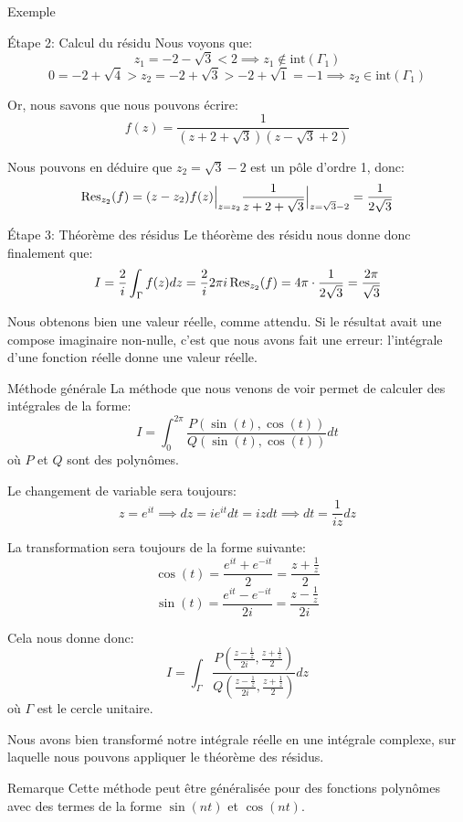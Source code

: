 \documentclass[a4paper]{article}
\begin{document}
\begin{parag}{Exemple}
\begin{subparag}{Étape 2: Calcul du résidu}
        Nous voyons que: 
        \[z_1 = -2 - \sqrt{3} < 2 \implies z_1 \not \in \text{int}\left(\Gamma_1\right)\] 
        \[0 = -2 + \sqrt{4} > z_2 = -2 + \sqrt{3} > -2 + \sqrt{1} = -1 \implies z_2 \in \text{int}\left(\Gamma_1\right)\]
        
        Or, nous savons que nous pouvons écrire: 
        \[f\left(z\right) = \frac{1}{\left(z + 2 + \sqrt{3}\right)\left(z - \sqrt{3} + 2\right)}\]
        
        Nous pouvons en déduire que $z_2 = \sqrt{3} -2$ est un pôle d'ordre 1, donc: 
        \[\Res_{z_2}\left(f\right) = \left(z-z_2\right) f\left(z\right) \eval_{z=z_2}^{} \frac{1}{z + 2 + \sqrt{3}} \eval_{z = \sqrt{3}- 2}^{} = \frac{1}{2\sqrt{3}}\]
    \end{subparag}

    \begin{subparag}{Étape 3: Théorème des résidus}
        Le théorème des résidu nous donne donc finalement que: 
        \[I = \frac{2}{i} \int_{\Gamma} f\left(z\right)dz = \frac{2}{i} 2\pi i \Res_{z_2}\left(f\right) = 4 \pi \cdot  \frac{1}{2\sqrt{3}} = \frac{2\pi}{\sqrt{3}}\]
        
        Nous obtenons bien une valeur réelle, comme attendu. Si le résultat avait une compose imaginaire non-nulle, c'est que nous avons fait une erreur: l'intégrale d'une fonction réelle donne une valeur réelle.
    \end{subparag}
\end{parag}

\begin{parag}{Méthode générale}
    La méthode que nous venons de voir permet de calculer des intégrales de la forme: 
    \[I = \int_{0}^{2\pi} \frac{P\left(\sin\left(t\right), \cos\left(t\right)\right)}{Q\left(\sin\left(t\right), \cos\left(t\right)\right)}dt\]
    où $P$ et $Q$ sont des polynômes.

    Le changement de variable sera toujours: 
    \[z = e^{it} \implies dz = i e^{it} dt = iz dt\implies dt = \frac{1}{iz} dz\]
    
    La transformation sera toujours de la forme suivante: 
    \[\cos\left(t\right) = \frac{e^{it} + e^{-it}}{2} = \frac{z + \frac{1}{z}}{2}\] 
    \[\sin\left(t\right) = \frac{e^{it} - e^{-it}}{2i} = \frac{z - \frac{1}{z}}{2i}\]

    Cela nous donne donc: 
    \[I = \int_{\Gamma} \frac{P\left(\frac{z - \frac{1}{z}}{2i}, \frac{z + \frac{1}{z}}{2}\right)}{Q\left(\frac{z - \frac{1}{z}}{2i}, \frac{z + \frac{1}{z}}{2}\right)} dz\]
    où $\Gamma$ est le cercle unitaire.

    Nous avons bien transformé notre intégrale réelle en une intégrale complexe, sur laquelle nous pouvons appliquer le théorème des résidus.

    \begin{subparag}{Remarque}
        Cette méthode peut être généralisée pour des fonctions polynômes avec des termes de la forme $\sin\left(nt\right)$ et $\cos\left(nt\right)$.
    \end{subparag}
\end{parag}
\end{document}
